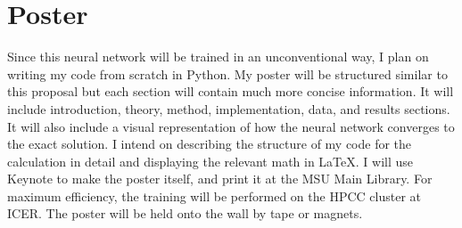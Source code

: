 \documentclass[prb,aps,twocolumn,showpacs,10pt]{revtex4-1}
\begin{document}

 \section{Poster}
 
Since this neural network will be trained in an unconventional way, I plan on writing my code from scratch in Python. My poster will be structured similar to this proposal but each section will contain much more concise information. It will include introduction, theory, method, implementation, data, and results sections. It will also include a visual representation of how the neural network converges to the exact solution. I intend on describing the structure of my code for the calculation in detail and displaying the relevant math in LaTeX. I will use Keynote to make the poster itself, and print it at the MSU Main Library. For maximum efficiency, the training will be performed on the HPCC cluster at ICER. The poster will be held onto the wall by tape or magnets. 

\end{document}
